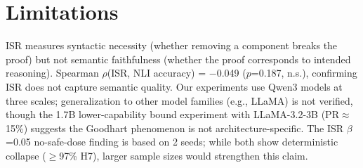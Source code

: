 \documentclass[11pt]{article}
\begin{document}
\section*{Limitations}

ISR measures syntactic necessity (whether removing a component breaks the proof) but not semantic faithfulness (whether the proof corresponds to intended reasoning). Spearman $\rho$(ISR, NLI accuracy) = $-$0.049 ($p$=0.187, n.s.), confirming ISR does not capture semantic quality. Our experiments use Qwen3 models at three scales; generalization to other model families (e.g., LLaMA) is not verified, though the 1.7B lower-capability bound experiment with LLaMA-3.2-3B (PR$\approx$15\%) suggests the Goodhart phenomenon is not architecture-specific. The ISR $\beta$=0.05 no-safe-dose finding is based on 2 seeds; while both show deterministic collapse ($\geq$97\% H7), larger sample sizes would strengthen this claim.

\end{document}

